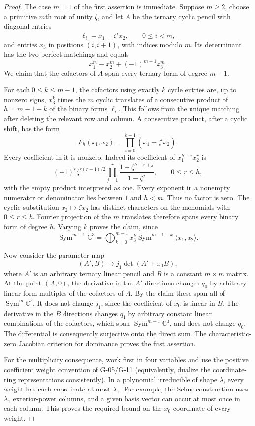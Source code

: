 \begin{proof}
The case $m=1$ of the first assertion is immediate. Suppose
$m\geq2$, choose a primitive $m$th root of unity $\zeta$,
and let $A$ be the ternary cyclic pencil with diagonal
entries
\[
 \ell_i=x_1-\zeta^i x_2,\qquad 0\leq i<m,
\]
and entries $x_3$ in positions $(i,i+1)$, with indices
modulo $m$. Its determinant has the two perfect matchings
and equals
\[
 x_1^m-x_2^m+(-1)^{m-1}x_3^m.
\]
We claim that the cofactors of $A$ span every ternary form
of degree $m-1$.

For each $0\leq k\leq m-1$, the cofactors using exactly
$k$ cycle entries are, up to nonzero signs, $x_3^k$ times
the $m$ cyclic translates of a consecutive product of
$h=m-1-k$ of the binary forms $\ell_i$. This follows from
the unique matching after deleting the relevant row and
column. A consecutive product, after a cyclic shift,
has the form
\[
 F_h(x_1,x_2)=\prod_{i=0}^{h-1}(x_1-\zeta^i x_2).
\]
Every coefficient in it is nonzero. Indeed its coefficient
of $x_1^{h-r}x_2^r$ is
\[
 (-1)^r\zeta^{r(r-1)/2}
   \prod_{j=1}^r\frac{1-\zeta^{h-r+j}}{1-\zeta^j},
 \qquad 0\leq r\leq h,
\]
with the empty product interpreted as one. Every exponent
in a nonempty numerator or denominator lies between $1$
and $h<m$. Thus no factor is zero. The cyclic substitution
$x_2\mapsto\zeta x_2$ has distinct characters on the
monomials with $0\leq r\leq h$. Fourier projection of the
$m$ translates therefore spans every binary form of degree
$h$. Varying $k$ proves the claim, since
\[
 \operatorname{Sym}^{m-1}\mathbb C^3
 =\bigoplus_{k=0}^{m-1}x_3^k
        \operatorname{Sym}^{m-1-k}\langle x_1,x_2\rangle.
\]

Now consider the parameter map
\[
 (A',B)\longmapsto j_1\det(A'+x_0B),
\]
where $A'$ is an arbitrary ternary linear pencil and $B$
is a constant $m\times m$ matrix. At the point $(A,0)$,
the derivative in the $A'$ directions changes $q_0$ by
arbitrary linear-form multiples of the cofactors of $A$.
By the claim these span all of
$\operatorname{Sym}^m\mathbb C^3$. It does not change
$q_1$, since the coefficient of $x_0$ is linear in $B$.
The derivative in the $B$ directions changes $q_1$ by
arbitrary constant linear combinations of the cofactors,
which span $\operatorname{Sym}^{m-1}\mathbb C^3$, and
does not change $q_0$. The differential is consequently
surjective onto the direct sum. The characteristic-zero
Jacobian criterion for dominance proves the first assertion.

For the multiplicity consequence, work first in four
variables and use the positive coefficient weight convention
of G-05/G-11 (equivalently, dualize the coordinate-ring
representations consistently). In a polynomial irreducible
of shape $\lambda$, every weight has each coordinate at
most $\lambda_1$. For example, the Schur construction uses
$\lambda_1$ exterior-power columns, and a given basis vector
can occur at most once in each column. This proves the
required bound on the $x_0$ coordinate of every weight.


\end{proof}
